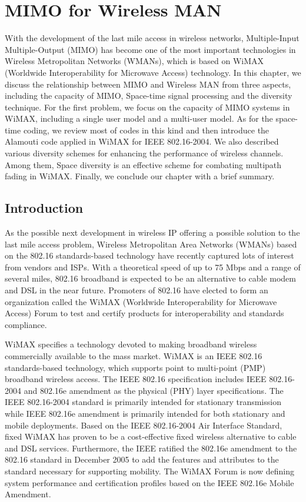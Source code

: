 \def\CTeXPreproc{Created by ctex v0.2.12, don't edit!}\chapter{MIMO for Wireless MAN}
\author{Xiaopeng Fan, Steven Y. Lai, Yuan Zheng, and Jiannong Cao\\
Hong Kong Polytechnic University}

With the development of the last mile access in wireless networks,
Multiple-Input Multiple-Output (MIMO) has become one of the most
important technologies in Wireless Metropolitan Networks (WMANs),
which is based on WiMAX (Worldwide Interoperability for Microwave
Access) technology.  In this chapter, we discuss the relationship
between MIMO and Wireless MAN from three aspects, including the
capacity of MIMO, Space-time signal processing and the diversity
technique. For the first problem, we focus on the capacity of MIMO
systems in WiMAX, including a single user model and a multi-user
model. As for the space-time coding, we review most of codes in this
kind and then introduce the Alamouti code applied in WiMAX for IEEE
802.16-2004. We also described various diversity schemes for
enhancing the performance of wireless channels. Among them, Space
diversity is an effective scheme for combating multipath fading in
WiMAX. Finally, we conclude our chapter with a brief summary.

\section{Introduction}
As the possible next development in wireless IP offering a possible
solution to the last mile access problem, Wireless Metropolitan Area
Networks (WMANs) based on the 802.16 standards-based technology
\cite{6} have recently captured lots of interest from vendors and
ISPs. With a theoretical speed of up to 75 Mbps and a range of
several miles, 802.16 broadband is expected to be an alternative to
cable modem and DSL in the near future. Promoters of 802.16 have
elected to form an organization called the WiMAX (Worldwide
Interoperability for Microwave Access) Forum \cite{7} to test and
certify products for interoperability and standards compliance.

WiMAX specifies a technology devoted to making broadband wireless
commercially available to the mass market. WiMAX is an IEEE 802.16
standards-based technology, which supports point to multi-point
(PMP) broadband wireless access. The IEEE 802.16 specification
includes IEEE 802.16-2004 \cite{31} and 802.16e amendment \cite{6}
as the physical (PHY) layer specifications. The IEEE 802.16-2004
standard is primarily intended for stationary transmission while
IEEE 802.16e amendment is primarily intended for both stationary and
mobile deployments. Based on the IEEE 802.16-2004 Air Interface
Standard, fixed WiMAX has proven to be a cost-effective fixed
wireless alternative to cable and DSL services. Furthermore, the
IEEE ratified the 802.16e amendment \cite{6} to the 802.16 standard
in December 2005 to add the features and attributes to the standard
necessary for supporting mobility. The WiMAX Forum is now defining
system performance and certification profiles based on the IEEE
802.16e Mobile Amendment.


